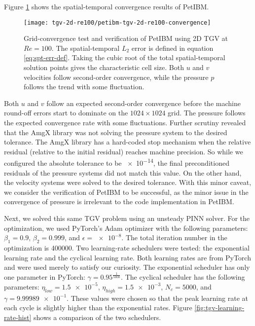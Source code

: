 Figure \ref{fig:tgv-petibm-convergence} shows the spatial-temporal convergence results of PetIBM.
\begin{figure}
    \centering%
    \texttt{[image: tgv-2d-re100/petibm-tgv-2d-re100-convergence]}%
    \caption{%
        Grid-convergence test and verification of PetIBM using 2D TGV at $Re=\num{100}$.
        The spatial-temporal $L_2$ error is defined in equation \eqref{eq:spt-err-def}.
        Taking the cubic root of the total spatial-temporal solution points gives the characteristic cell size.
        Both $u$ and $v$ velocities follow second-order convergence, while the pressure $p$ follows the trend with some fluctuation.
    }
    \label{fig:tgv-petibm-convergence}%
\end{figure}
Both $u$ and $v$ follow an expected second-order convergence before the machine round-off errors start to dominate on the $1024 \times 1024$ grid.
The pressure follows the expected convergence rate with some fluctuations.
Further scrutiny revealed that the AmgX library was not solving the pressure system to the desired tolerance.
The AmgX library has a hard-coded stop mechanism when the relative residual (relative to the initial residual) reaches machine precision.
So while we configured the absolute tolerance to be \num{e-14}, the final preconditioned residuals of the pressure systems did not match this value.
On the other hand, the velocity systems were solved to the desired tolerance.
With this minor caveat, we consider the verification of PetIBM to be successful, as the minor issue in the convergence of pressure is irrelevant to the code implementation in PetIBM.

Next, we solved this same TGV problem using an unsteady PINN solver.
For the optimization, we used PyTorch's Adam optimizer
with the following parameters: $\beta_1=\num{0.9}$, $\beta_2=\num{0.999}$, and $\epsilon=\num{e-8}$.
The total iteration number in the optimization is \num{400000}.
Two learning-rate schedulers were tested: the exponential learning rate and the cyclical learning rate.
Both learning rates are from PyTorch and were used merely to satisfy our curiosity.
The exponential scheduler has only one parameter in PyTorch: $\gamma=0.95^{\frac{1}{5000}}$.
The cyclical scheduler has the following parameters: $\eta_{low}=\num{1.5e-5}$, $\eta_{high}=\num{1.5e-3}$, $N_c=\num{5000}$, and $\gamma=\num{9.99989e-1}$.
These values were chosen so that the peak learning rate at each cycle is slightly higher than the exponential rates.
Figure \ref{fig:tgv-learning-rate-hist} shows a comparison of the two schedulers.

